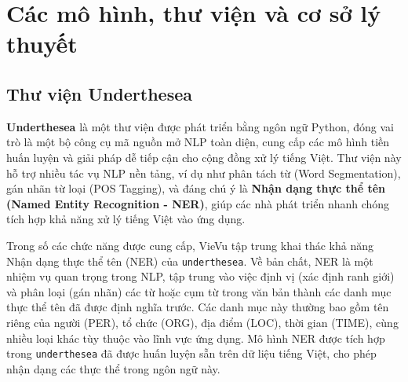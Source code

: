 \section{Các mô hình, thư viện và cơ sở lý thuyết}
\label{sec:fundamental_knowledge}
\subsection{Thư viện Underthesea}



\textbf{Underthesea} \cite{underthesea_lib} là một thư viện được phát triển bằng ngôn ngữ Python, đóng vai trò là một bộ công cụ mã nguồn mở NLP toàn diện, cung cấp các mô hình tiền huấn luyện và giải pháp dễ tiếp cận cho cộng đồng xử lý tiếng Việt. Thư viện này hỗ trợ nhiều tác vụ NLP nền tảng, ví dụ như phân tách từ (Word Segmentation), gán nhãn từ loại (POS Tagging), và đáng chú ý là \textbf{Nhận dạng thực thể tên (Named Entity Recognition - NER)}, giúp các nhà phát triển nhanh chóng tích hợp khả năng xử lý tiếng Việt vào ứng dụng.

Trong số các chức năng được cung cấp, VieVu tập trung khai thác khả năng Nhận dạng thực thể tên (NER) của \texttt{underthesea}. Về bản chất, NER \cite{ner_concept} là một nhiệm vụ quan trọng trong NLP, tập trung vào việc định vị (xác định ranh giới) và phân loại (gán nhãn) các từ hoặc cụm từ trong văn bản thành các danh mục thực thể tên đã được định nghĩa trước. Các danh mục này thường bao gồm tên riêng của người (PER), tổ chức (ORG), địa điểm (LOC), thời gian (TIME), cùng nhiều loại khác tùy thuộc vào lĩnh vực ứng dụng. Mô hình NER được tích hợp trong \texttt{underthesea} đã được huấn luyện sẵn trên dữ liệu tiếng Việt, cho phép nhận dạng các thực thể trong ngôn ngữ này.

